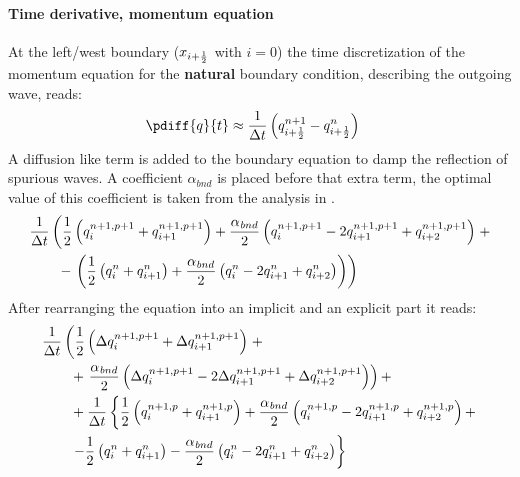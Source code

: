 \paragraph*{Time derivative, momentum equation}
At the left/west boundary ($x_{i+\frac{1}{2}}$ with $i=0$) the time discretization of the momentum equation for the \textbf{natural} boundary condition, describing the outgoing wave, reads:
\begin{align}
    \pdiff{q}{t} & \approx \frac{1}{\Dt} \left(  q^{n+1}_{i+\half} - q^{n}_{i+\half} \right)
\end{align}
A diffusion like term is added to the boundary equation to damp the reflection of spurious waves.
A coefficient $\alpha_{\mathit bnd}$ is placed before that extra term, the optimal value of this coefficient is taken from the analysis in \citet{transpeq-analysisdiscretizationinsidedomain_boundaries.mw}.
\begin{align}
    & \frac{1}{\Delta t}\left( \frac{1}{2} \left( q^{n+1,p+1}_{i} + q^{n+1,p+1}_{i+1} \right)
    + \frac{\alpha_{\mathit bnd}}{2} \left( q^{n+1,p+1}_{i} - 2 q^{n+1,p+1}_{i+1} + q^{n+1,p+1}_{i+2}  \right) \right. +
    \nonumber \\*
    & \qquad  - \left. \left(
    \frac{1}{2} \left( q^{n}_{i} + q^{n}_{i+1} \right)
    + \frac{\alpha_{\mathit bnd}}{2}  \left( q^{n}_{i} - 2 q^{n}_{i+1} + q^{n}_{i+2}  \right) \right)
    \right)
\end{align}
After rearranging the equation into an implicit and an explicit part it reads:
\begin{align}
    & \frac{1}{\Delta t}  \left( \frac{1}{2} \left( \Delta q^{n+1, p+1}_{i} + \Delta q^{n+1, p+1}_{i+1} \right) \right. +
    \nonumber \\*
    & \qquad + \left. \frac{\alpha_{\mathit bnd}}{2}\left( \Delta q^{n+1,p+1}_{i} - 2 \Delta q^{n+1,p+1}_{i+1} + \Delta q^{n+1,p+1}_{i+2} \right) \right) +
    \nonumber \\
    & \qquad +  \frac{1}{\Delta t} \left\{ \frac{1}{2} \left( q^{n+1, p}_{i} + q^{n+1, p}_{i+1} \right) + \frac{\alpha_{\mathit bnd}}{2}\left( q^{n+1,p}_{i} - 2 q^{n+1,p}_{i+1}  + q^{n+1,p}_{i+2} \right) + \right.
    \nonumber \\*
    & \qquad
    \left.  - \frac{1}{2} \left( q^{n}_{i} + q^{n}_{i+1} \right) - \frac{\alpha_{\mathit bnd}}{2} \left( q^{n}_{i} - 2 q^{n}_{i+1} + q^{n}_{i+2}  \right) \right\}
\end{align}
